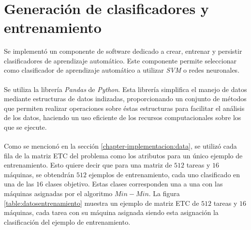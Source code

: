 \section{Generación de clasificadores y entrenamiento} \label{chapter-implementacion:clasificadores}

\paragraph{} Se implementó un componente de software dedicado a crear, entrenar y persistir clasificadores de aprendizaje automático.
Este componente permite seleccionar como clasificador de aprendizaje automático a utilizar \textit{SVM} o redes neuronales.

\paragraph{} Se utiliza la librería \textit{Pandas}\cite{bib-pandas} de \textit{Python}.
Esta librería simplifica el manejo de datos mediante estructuras de datos indizadas, proporcionando un conjunto de métodos que permiten realizar operaciones sobre éstas estructuras para facilitar el análisis de los datos, haciendo un uso eficiente de los recursos computacionales sobre los que se ejecute.

\paragraph{} Como se mencionó en la sección \ref{chapter-implementacion:data}, se utilizó cada fila de la matriz ETC del problema como los atributos para un único ejemplo de entrenamiento.
Esto quiere decir que para una matriz de $512$ tareas y $16$ máquinas, se obtendrán $512$ ejemplos de entrenamiento, cada uno clasificado en una de las $16$ clases objetivo.
Estas clases corresponden una a una con las máquinas asignadas por el algoritmo $Min-Min$.
La figura \ref{table:datosentrenamiento} muestra un ejemplo de matriz ETC de $512$ tareas y $16$ máquinas, cada tarea con su máquina asignada siendo esta asignación la clasificación del ejemplo de entrenamiento.


